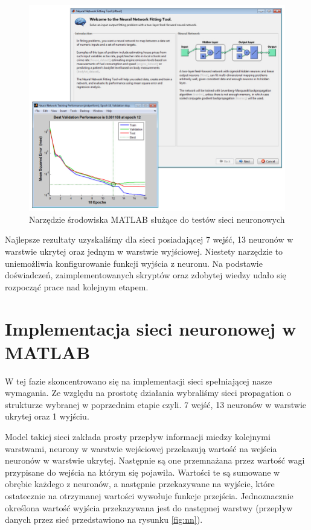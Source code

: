 \begin{figure}[tbph!]
	\centering
	\includegraphics[width=0.9\linewidth]{images/matlabnn.jpg}
	\caption{Narzędzie środowiska MATLAB służące do testów sieci neuronowych}
	\label{fig:nnmatlab}
\end{figure}

Najlepsze rezultaty uzyskaliśmy dla sieci posiadającej 7 wejść, 13 neuronów w warstwie ukrytej oraz jednym w warstwie wyjściowej. Niestety narzędzie to uniemożliwia konfigurowanie funkcji wyjścia z neuronu. Na podstawie doświadczeń, zaimplementowanych skryptów oraz zdobytej wiedzy udało się rozpocząć prace nad kolejnym etapem.

\section{Implementacja sieci neuronowej w MATLAB}
\label{cha:impl-MATLAB}
W tej fazie skoncentrowano się na implementacji sieci spełniającej nasze wymagania. Ze względu na prostotę działania wybraliśmy sieci propagation o strukturze wybranej w poprzednim etapie czyli. 7 wejść, 13 neuronów w warstwie ukrytej oraz 1 wyjściu.

Model takiej sieci zakłada prosty przepływ informacji miedzy kolejnymi warstwami, neurony w warstwie wejściowej przekazują wartość na wejścia neuronów w warstwie ukrytej.
Następnie są one przemnażana przez wartość wagi przypisane do wejścia na którym się pojawiła. Wartości te są sumowane w obrębie każdego z neuronów, a następnie przekazywane na wyjście, które ostatecznie na otrzymanej wartości wywołuje funkcje przejścia. Jednoznacznie określona wartość wyjścia przekazywana jest do następnej warstwy (przepływ danych przez sieć przedstawiono na rysunku \ref{fig:nn}).

